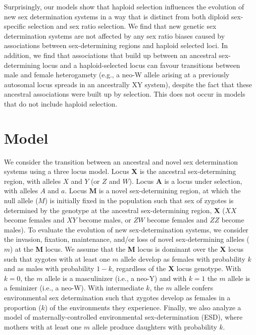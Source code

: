 \documentclass[12pt]{article}
\begin{document}
Surprisingly, our models show that haploid selection influences the evolution of new sex determination systems in a way that is distinct from both diploid sex-specific selection and sex ratio selection. 
We find that new genetic sex determination systems are not affected by any sex ratio biases caused by associations between sex-determining regions and haploid selected loci. 
In addition, we find that associations that build up between an ancestral sex-determining locus and a haploid-selected locus can favour transitions between male and female heterogamety (e.g., a neo-W allele arising at a previously autosomal locus spreads in an ancestrally XY system), despite the fact that these ancestral associations were built up by selection. 
This does not occur in models that do not include haploid selection. 

\section*{Model}

We consider the transition between an ancestral and novel sex determination systems using a three locus model.
Locus \textbf{X} is the ancestral sex-determining region, with alleles $X$ and $Y$ (or $Z$ and $W$).
Locus \textbf{A} is a locus under selection, with alleles $A$ and $a$.
Locus \textbf{M} is a novel sex-determining region, at which the null allele ($M$) is initially fixed in the population such that sex of zygotes is determined by the genotype at the ancestral sex-determining region, \textbf{X} ($XX$ become females and $XY$ become males, or $ZW$ become females and $ZZ$ become males). 
To evaluate the evolution of new sex-determination systems, we consider the invasion, fixation, maintenance, and/or loss of novel sex-determining alleles ($m$) at the \textbf{M} locus. 
We assume that the \textbf{M} locus is dominant over the \textbf{X} locus such that zygotes with at least one $m$ allele develop as females with probability $k$ and as males with probability $1-k$, regardless of the \textbf{X} locus genotype.
With $k=0$, the $m$ allele is a masculinizer (i.e., a neo-Y) and with $k=1$ the $m$ allele is a feminizer (i.e., a neo-W).
With intermediate $k$, the $m$ allele confers environmental sex determination such that zygotes develop as females in a proportion ($k$) of the environments they experience. 
Finally, we also analyze a model of maternally-controlled environmental sex-determination (ESD), where mothers with at least one $m$ allele produce daughters with probability $k$. 
\end{document}
